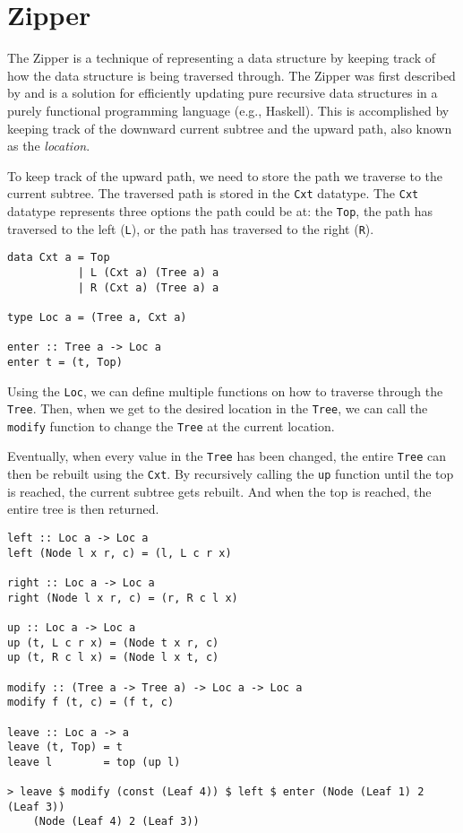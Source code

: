 \section{Zipper}


The Zipper is a technique of representing a data structure by keeping track of how the data structure is being traversed through. The Zipper was first described by \citeauthor{huet1997zipper}\cite{huet1997zipper} and is a solution for efficiently updating pure recursive data structures in a purely functional programming language (e.g., Haskell). This is accomplished by keeping track of the downward current subtree and the upward path, also known as the \textit{location}. 

To keep track of the upward path, we need to store the path we traverse to the current subtree. The traversed path is stored in the \texttt{Cxt} datatype. The \texttt{Cxt} datatype represents three options the path could be at: the \texttt{Top}, the path has traversed to the left (\texttt{L}), or the path has traversed to the right (\texttt{R}).

\begin{verbatim}
data Cxt a = Top
           | L (Cxt a) (Tree a) a
           | R (Cxt a) (Tree a) a

type Loc a = (Tree a, Cxt a)

enter :: Tree a -> Loc a
enter t = (t, Top)           
\end{verbatim}

Using the \texttt{Loc}, we can define multiple functions on how to traverse through the \texttt{Tree}. Then, when we get to the desired location in the \texttt{Tree}, we can call the \texttt{modify} function to change the \texttt{Tree} at the current location.

Eventually, when every value in the \texttt{Tree} has been changed, the entire \texttt{Tree} can then be rebuilt using the \texttt{Cxt}. By recursively calling the \texttt{up} function until the top is reached, the current subtree gets rebuilt. And when the top is reached, the entire tree is then returned.

\begin{verbatim}
left :: Loc a -> Loc a
left (Node l x r, c) = (l, L c r x)

right :: Loc a -> Loc a
right (Node l x r, c) = (r, R c l x)

up :: Loc a -> Loc a
up (t, L c r x) = (Node t x r, c)
up (t, R c l x) = (Node l x t, c)

modify :: (Tree a -> Tree a) -> Loc a -> Loc a
modify f (t, c) = (f t, c)

leave :: Loc a -> a
leave (t, Top) = t
leave l        = top (up l)

> leave $ modify (const (Leaf 4)) $ left $ enter (Node (Leaf 1) 2 (Leaf 3))
    (Node (Leaf 4) 2 (Leaf 3))
\end{verbatim}


